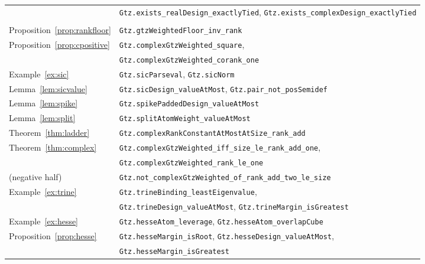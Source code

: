 {\begin{longtable}{@{}ll@{}}
                               & \texttt{Gtz.exists\_realDesign\_exactlyTied},
                                 \texttt{Gtz.exists\_complexDesign\_exactlyTied} \\
\addlinespace
\multicolumn{2}{@{}l}{\emph{\S\ref{sec:complex}, the complex problem}}\\
Proposition~\ref{prop:rankfloor}
                               & \texttt{Gtz.gtzWeightedFloor\_inv\_rank} \\
Proposition~\ref{prop:cpositive}
                               & \texttt{Gtz.complexGtzWeighted\_square}, \\
                               & \texttt{Gtz.complexGtzWeighted\_corank\_one} \\
Example~\ref{ex:sic}           & \texttt{Gtz.sicParseval}, \texttt{Gtz.sicNorm} \\
Lemma~\ref{lem:sicvalue}       & \texttt{Gtz.sicDesign\_valueAtMost},
                                 \texttt{Gtz.pair\_not\_posSemidef} \\
Lemma~\ref{lem:spike}          & \texttt{Gtz.spikePaddedDesign\_valueAtMost} \\
Lemma~\ref{lem:split}          & \texttt{Gtz.splitAtomWeight\_valueAtMost} \\
Theorem~\ref{thm:ladder}       & \texttt{Gtz.complexRankConstantAtMostAtSize\_rank\_add} \\
Theorem~\ref{thm:complex}      & \texttt{Gtz.complexGtzWeighted\_iff\_size\_le\_rank\_add\_one}, \\
                               & \texttt{Gtz.complexGtzWeighted\_rank\_le\_one} \\
\quad (negative half)          & \texttt{Gtz.not\_complexGtzWeighted\_of\_rank\_add\_two\_le\_size} \\
Example~\ref{ex:trine}         & \texttt{Gtz.trineBinding\_leastEigenvalue}, \\
                               & \texttt{Gtz.trineDesign\_valueAtMost},
                                 \texttt{Gtz.trineMargin\_isGreatest} \\
Example~\ref{ex:hesse}         & \texttt{Gtz.hesseAtom\_leverage},
                                 \texttt{Gtz.hesseAtom\_overlapCube} \\
Proposition~\ref{prop:hesse}   & \texttt{Gtz.hesseMargin\_isRoot},
                                 \texttt{Gtz.hesseDesign\_valueAtMost}, \\
                               & \texttt{Gtz.hesseMargin\_isGreatest} \\

\end{longtable}}
